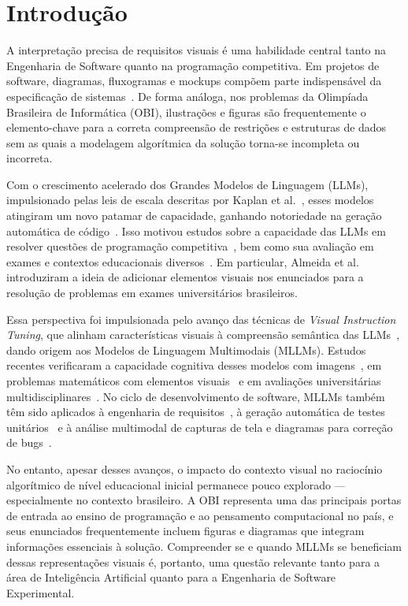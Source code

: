 \documentclass[sigconf,anonymous]{acmart} %
\begin{document}
\section{Introdução}

A interpretação precisa de requisitos visuais é uma habilidade central tanto na 
Engenharia de Software quanto na programação competitiva. Em projetos de software, 
diagramas, fluxogramas e mockups compõem parte indispensável da especificação de 
sistemas~\cite{Mendoza2024Comparative}. De forma análoga, nos problemas da 
Olimpíada Brasileira de Informática (OBI), ilustrações e figuras são frequentemente 
o elemento-chave para a correta compreensão de restrições e estruturas de dados 
sem as quais a modelagem algorítmica da solução torna-se incompleta ou incorreta.

Com o crescimento acelerado dos Grandes Modelos de Linguagem (LLMs), impulsionado 
pelas leis de escala descritas por Kaplan et al.~\cite{kaplan2020scaling}, esses 
modelos atingiram um novo patamar de capacidade, ganhando notoriedade na geração 
automática de código~\cite{Chen:2021:ELL}. Isso motivou estudos sobre a capacidade 
das LLMs em resolver questões de programação competitiva~\cite{Zheng2025LiveCodeBenchPH}, 
bem como sua avaliação em exames e contextos educacionais 
diversos~\cite{Viegas2025AssessingTC, Mendona2024EvaluatingCV, nunes2023evaluating}. 
Em particular, Almeida et al.~\cite{Almeida2023BLUEXAB} introduziram a ideia de 
adicionar elementos visuais nos enunciados para a resolução de problemas em exames 
universitários brasileiros.

Essa perspectiva foi impulsionada pelo avanço das técnicas de \textit{Visual 
Instruction Tuning}, que alinham características visuais à compreensão semântica 
das LLMs~\cite{Liu2023VisualIT}, dando origem aos Modelos de Linguagem Multimodais 
(MLLMs). Estudos recentes verificaram a capacidade cognitiva desses modelos com 
imagens~\cite{Fu2023MMEAC}, em problemas matemáticos com elementos 
visuais~\cite{Lu2023MathVistaEM} e em avaliações universitárias 
multidisciplinares~\cite{Yue2023MMMUAM}. No ciclo de desenvolvimento de software, 
MLLMs também têm sido aplicados à engenharia de 
requisitos~\cite{Mendoza2024Comparative}, à geração automática de testes 
unitários~\cite{Silva2025LLMs} e à análise multimodal de capturas de tela e 
diagramas para correção de bugs~\cite{Yang2024SWEbenchMD}.

No entanto, apesar desses avanços, o impacto do contexto visual no raciocínio 
algorítmico de nível educacional inicial permanece pouco explorado --- especialmente 
no contexto brasileiro. A OBI representa uma das principais portas de entrada ao 
ensino de programação e ao pensamento computacional no país, e seus enunciados 
frequentemente incluem figuras e diagramas que integram informações essenciais à 
solução. Compreender se e quando MLLMs se beneficiam dessas representações visuais 
é, portanto, uma questão relevante tanto para a área de Inteligência Artificial 
quanto para a Engenharia de Software Experimental.
\end{document}
